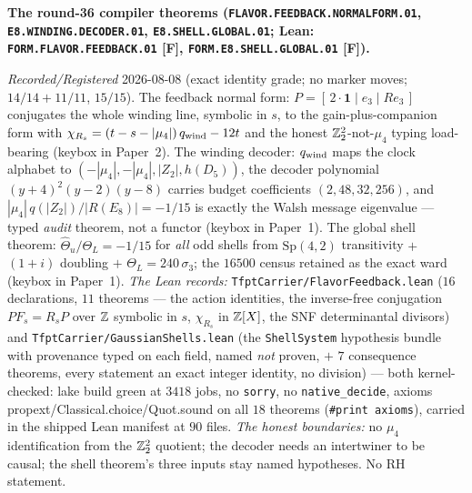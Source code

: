 \par\smallskip\noindent\textbf{The round-36 compiler theorems
(\texttt{FLAVOR.FEEDBACK.\allowbreak NORMALFORM.01},
\texttt{E8.WINDING.\allowbreak DECODER.01},
\texttt{E8.SHELL.GLOBAL.01}; Lean:
\texttt{FORM.FLAVOR.\allowbreak FEEDBACK.01} [F],
\texttt{FORM.E8.SHELL.\allowbreak GLOBAL.01} [F]).}
{\sloppy
\emph{Recorded/Registered} 2026-08-08 (exact identity grade; no
marker moves;  $14/14 +
11/11$,  $15/15$).  The
feedback normal form: $P = [\,2\cdot\mathbf 1 \mid e_3 \mid
R e_3\,]$ conjugates the whole winding line, symbolic in $s$,
to the gain-plus-companion form with $\chi_{R_s} = (t - s -
|\mu_4|)\,q_{\rm wind} - 12t$ and the honest $\mathbb Z_2^2$-not-$\mu_4$
typing load-bearing (keybox in Paper~2).  The winding decoder:
$q_{\rm wind}$ maps the clock alphabet to
$(-|\mu_4|,-|\mu_4|,|Z_2|,h(D_5))$, the decoder polynomial
$(y{+}4)^2(y{-}2)(y{-}8)$ carries budget coefficients
$(2,48,32,256)$, and $|\mu_4|\,q(|Z_2|)/|R(E_8)| = -1/15$ is
exactly the Walsh message eigenvalue --- typed \emph{audit}
theorem, not a functor (keybox in Paper~1).  The global shell
theorem: $\hat\Theta_u/\Theta_L = -1/15$ for \emph{all} odd
shells from $\mathrm{Sp}(4,2)$ transitivity $+$ $(1{+}i)$
doubling $+$ $\Theta_L = 240\,\sigma_3$; the $16500$ census
retained as the exact ward (keybox in Paper~1).  \emph{The Lean
records:} \texttt{TfptCarrier/FlavorFeedback.lean} ($16$
declarations, $11$ theorems --- the action identities, the
inverse-free conjugation $PF_s = R_sP$ over $\mathbb Z$ symbolic in
$s$, $\chi_{R_s}$ in $\mathbb Z[X]$, the SNF determinantal divisors)
and \texttt{TfptCarrier/GaussianShells.lean} (the
\texttt{ShellSystem} hypothesis bundle with provenance typed on
each field, named \emph{not} proven, $+$ $7$ consequence
theorems, every statement an exact integer identity, no
division) --- both kernel-checked: lake build green at $3418$
jobs, no \texttt{sorry}, no \texttt{native\_decide}, axioms
propext/Classical.choice/Quot.sound on all $18$ theorems
(\texttt{\#print axioms}), carried in the shipped Lean manifest
at $90$ files.  \emph{The honest boundaries:} no $\mu_4$
identification from the $\mathbb Z_2^2$ quotient; the decoder needs an
intertwiner to be causal; the shell theorem's three inputs stay
named hypotheses.  No RH statement.\par}

